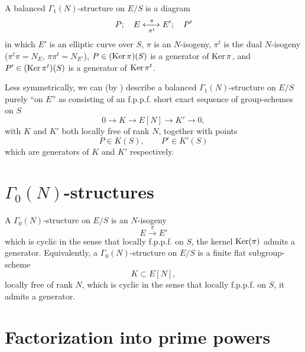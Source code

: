 A balanced $\Gamma_1(N)$-structure on $E/S$ is a diagram
\begin{equation}\label{eq:3.3.1}
P;\quad E \xleftrightarrow[\ \pi^t\ ]{\ \pi\ } E';\quad P'
\end{equation}
in which $E'$ is an elliptic curve over $S$, $\pi$ is an $N$-isogeny, $\pi^t$ is the dual $N$-isogeny ($\pi^t \pi = N_E$, $\pi \pi^t = N_{E'}$), $P \in (\operatorname{Ker} \pi)(S)$ is a generator of $\operatorname{Ker} \pi$, and $P' \in (\operatorname{Ker} \pi^t)(S)$ is a generator of $\operatorname{Ker} \pi^t$.

Less symmetrically, we can (by \cite[III, Exp.~V, 4.1]{SGA}) describe a balanced $\Gamma_1(N)$-structure on $E/S$ purely ``on $E$'' as consisting of an f.p.p.f. short exact sequence of group-schemes on $S$
\begin{equation}\label{eq:3.3.2}
0 \longrightarrow K \longrightarrow E[N] \longrightarrow K' \longrightarrow 0,
\end{equation}
with $K$ and $K'$ both locally free of rank $N$, together with points
\begin{equation}\label{eq:3.3.3}
P \in K(S), \qquad P' \in K'(S)
\end{equation}
which are generators of $K$ and $K'$ respectively.

\section{$\Gamma_0(N)$-structures}
\label{sec:3.4}

A $\Gamma_0(N)$-structure on $E/S$ is an $N$-isogeny
\begin{equation}\label{eq:3.4.1}
E \xrightarrow{\ \pi\ } E'
\end{equation}
which is cyclic in the sense that locally f.p.p.f. on $S$, the kernel $\operatorname{Ker}(\pi)$ admits a generator. Equivalently, a $\Gamma_0(N)$-structure on $E/S$ is a finite flat subgroup-scheme
\begin{equation}\label{eq:3.4.2}
K \subset E[N],
\end{equation}
locally free of rank $N$, which is cyclic in the sense that locally f.p.p.f. on $S$, it admits a generator.

\section{Factorization into prime powers}
\label{sec:3.5}

